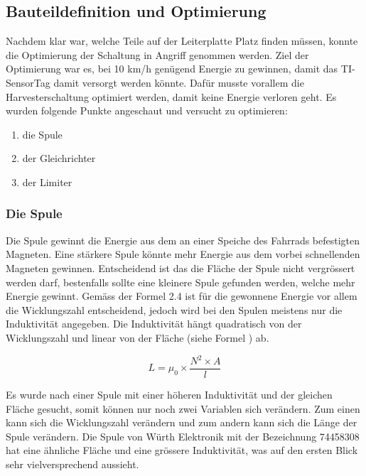 \subsection{Bauteildefinition und Optimierung}

Nachdem klar war, welche Teile auf der Leiterplatte Platz finden müssen, konnte die Optimierung der Schaltung in Angriff genommen werden. Ziel der Optimierung war es, bei 10 km/h genügend Energie zu gewinnen, damit das TI-SensorTag damit versorgt werden könnte. Dafür musste vorallem die Harvesterschaltung optimiert werden, damit keine Energie verloren geht. 
Es wurden folgende Punkte angeschaut und versucht zu optimieren:

\begin{enumerate}
    \item die Spule
    \item der Gleichrichter
    \item der Limiter
\end{enumerate}

\subsubsection{Die Spule}

Die Spule gewinnt die Energie aus dem an einer Speiche des Fahrrads befestigten Magneten. Eine stärkere Spule könnte mehr Energie aus dem vorbei schnellenden Magneten gewinnen. Entscheidend ist das die Fläche der Spule nicht vergrössert werden darf, bestenfalls sollte eine kleinere Spule gefunden werden, welche mehr Energie gewinnt. Gemäss der Formel 2.4 ist für die gewonnene Energie vor allem die Wicklungszahl entscheidend, jedoch wird bei den Spulen meistens nur die Induktivität angegeben. Die Induktivität hängt quadratisch von der Wicklungszahl und linear von der Fläche (siehe Formel \cite{equ_inductivity}) ab.

\begin{equation}
	L = \mu_0 \times \frac{N^2\times A}{l}
\end{equation}

Es wurde nach einer Spule mit einer höheren Induktivität und der gleichen Fläche gesucht, somit können nur noch zwei Variablen sich verändern. Zum einen kann sich die Wicklungszahl verändern und zum andern kann sich die Länge der Spule verändern. Die Spule von Würth Elektronik mit der Bezeichnung 74458308 hat eine ähnliche Fläche und eine grössere Induktivität, was auf den ersten Blick sehr vielversprechend aussieht.

